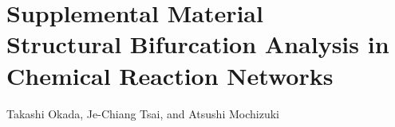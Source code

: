 \documentclass[ amsmath,amssymb,nofootinbib
]{revtex4-1}
\begin{document}
\appendix


\setcounter{equation}{0}
\setcounter{figure}{0}
\setcounter{table}{0}
\setcounter{page}{1}
\makeatletter
\renewcommand{\thefigure}{S\arabic{figure}}




\section*{\large \textbf{Supplemental Material}\ \\
Structural Bifurcation Analysis in Chemical Reaction Networks
}

\begin{center}
  Takashi Okada, Je-Chiang Tsai, and Atsushi Mochizuki\\
\end{center}
\end{document}
